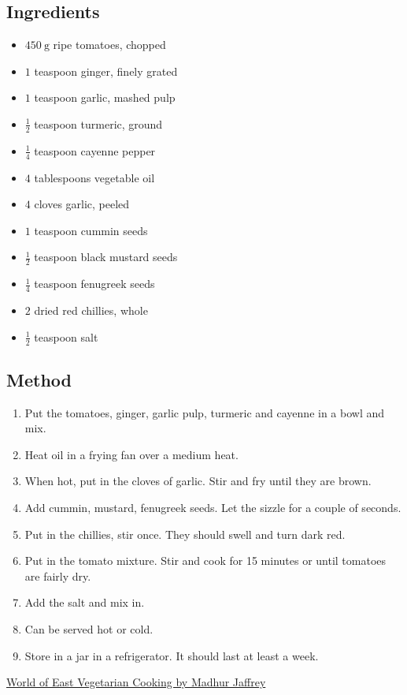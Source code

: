 \documentclass[11pt,a4paper]{article}
\begin{document}
\subsection*{Ingredients}

\begin{multicols}{2}

\begin{itemize}
  \item $ \qty{450}{\gram} $ ripe tomatoes, chopped
  \item $ 1 $ teaspoon ginger, finely grated
  \item $ 1 $ teaspoon garlic, mashed pulp
  \item $ \frac{1}{2} $ teaspoon turmeric, ground
  \item $ \frac{1}{4} $ teaspoon cayenne pepper
  \item $ 4 $ tablespoons vegetable oil
\end{itemize}

\columnbreak{}

\begin{itemize}
  \item $ 4 $ cloves garlic, peeled
  \item $ 1 $ teaspoon cummin seeds 
  \item $ \frac{1}{2} $ teaspoon black mustard seeds
  \item $ \frac{1}{4} $ teaspoon fenugreek seeds
  \item $ 2 $ dried red chillies, whole
  \item $ \frac{1}{2} $ teaspoon salt
\end{itemize}

\end{multicols}

\medskip

\subsection*{Method}

\begin{enumerate}
  \item Put the tomatoes, ginger, garlic pulp, turmeric and cayenne in a bowl and mix.
  \item Heat oil in a frying fan over a medium heat.
  \item When hot, put in the cloves of garlic. Stir and fry until they are brown.
  \item Add cummin, mustard, fenugreek seeds. Let the sizzle for a couple of seconds.
  \item Put in the chillies, stir once. They should swell and turn dark red.
  \item Put in the tomato mixture. Stir and cook for 15 minutes or until tomatoes are fairly dry.
  \item Add the salt and mix in.
  \item Can be served hot or cold.
  \item Store in a jar in a refrigerator. It should last at least a week.
\end{enumerate}

\href{https://www.penguin.com.au/books/eastern-vegetarian-cooking-9780099777205}{World of East Vegetarian Cooking by Madhur Jaffrey}
\end{document}
